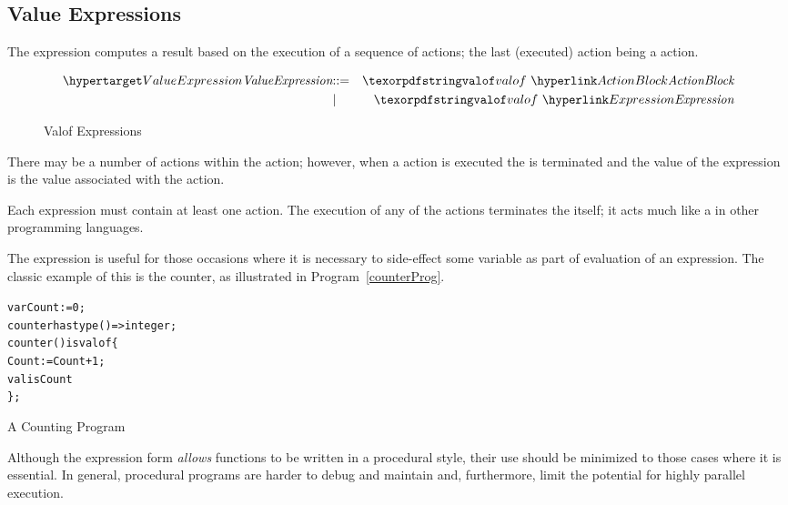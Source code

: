 \begin{prooftree}
\end{prooftree}

\subsection{Value Expressions}
\label{valueExpression}

The  expression computes a result based on the execution of a sequence of actions; the last (executed) action being a  action.

\begin{figure}[htbp]
\begin{eqnarray*}
\ntDef{ValueExpression}&\arrow&\q{valof}\ \ntRef{ActionBlock}\\
&\choice&\q{valof}\ \ntRef{Expression}
\end{eqnarray*}
\caption{Valof Expressions}
\label{valueExpressionFig}
\end{figure}

There may be a number of actions within the  action; however, when a  action is executed the  is terminated and the value of the  expression is the value associated with the  action.

\begin{aside}
Each  expression must contain at least one  action. The execution of any of the  actions terminates the  itself; it acts much like a  in other programming languages.
\end{aside}

The  expression is useful for those occasions where it is necessary to side-effect some variable as part of evaluation of an expression. The classic example of this is the counter, as illustrated in Program~\vref{counterProg}.
\begin{program}
\begin{alltt}
var Count := 0;
counter has type ()=>integer;
counter() is valof\{
  Count := Count+1;
  valis Count
\};
\end{alltt}
\caption{A Counting Program\label{counterProg}}
\end{program}
\begin{aside}
Although the  expression form \emph{allows} functions to be written in a procedural style, their use should be minimized to those cases where it is essential. In general, procedural programs are harder to debug and maintain and, furthermore, limit the potential for highly parallel execution.
\end{aside}

